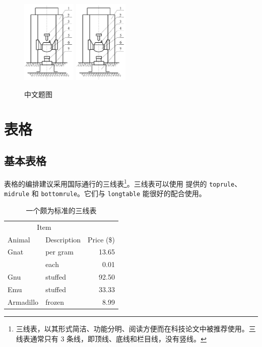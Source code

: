 \begin{figure}[h]
  \centering
  \includegraphics[height=4cm]{figures/cn100t.png}
  \hspace{1cm}
  \includegraphics[height=4cm]{figures/cn100t.png}
  \caption{中文题图}
  \label{fig:cn100t-2}
\end{figure}


\section{表格}

\subsection{基本表格}
表格的编排建议采用国际通行的三线表\footnote{三线表，以其形式简洁、功能分明、阅读方便而在科技论文中被推荐使用。三线表通常只有 3 条线，即顶线、底线和栏目线，没有竖线。}。三线表可以使用  提供的 \texttt{toprule}、\texttt{midrule} 和
\texttt{bottomrule}。它们与 \texttt{longtable} 能很好的配合使用。

\begin{table}[h]
  \caption{一个颇为标准的三线表}
  \label{tab:firstone}
  \centering
  \begin{tabular}{@{}llr@{}} \toprule
    \multicolumn{2}{c}{Item} \\ \cmidrule(r){1-2}
    Animal & Description & Price (\$)\\ \midrule
    Gnat  & per gram  & 13.65 \\
          & each      & 0.01 \\
    Gnu   & stuffed   & 92.50 \\
    Emu   & stuffed   & 33.33 \\
    Armadillo & frozen & 8.99 \\ \bottomrule
  \end{tabular}
\end{table}
